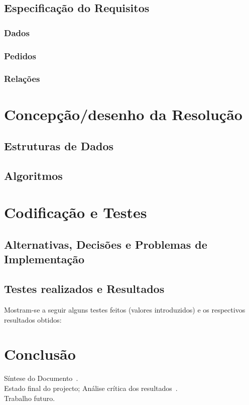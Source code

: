 \documentclass[12pt,a4paper]{report}%
\begin{document}
\section{Especificação do Requisitos}
\subsection{Dados} \label{subsec:dados} %
\subsection{Pedidos}
\subsection{Relações}

\chapter{Concepção/desenho da Resolução}
\section{Estruturas de Dados}
\section{Algoritmos}

\chapter{Codificação e Testes}
\section{Alternativas, Decisões e Problemas de Implementação}
\section{Testes realizados e Resultados}
Mostram-se a seguir alguns testes feitos (valores introduzidos) e
os respectivos resultados obtidos:


\chapter{Conclusão} \label{concl}
Síntese do Documento~\cite{araujo:2018,martini:2018}.\\
Estado final do projecto; Análise crítica dos resultados~\cite{Sto77a}.\\
Trabalho futuro.
\end{document}
